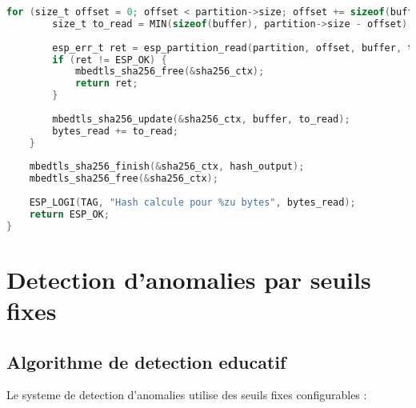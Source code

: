 \begin{lstlisting}[language=C, caption={Module de verification d'integrite - integrity\_checker.c}, label=lst:integrity-checker]
    for (size_t offset = 0; offset < partition->size; offset += sizeof(buffer)) {
        size_t to_read = MIN(sizeof(buffer), partition->size - offset);
        
        esp_err_t ret = esp_partition_read(partition, offset, buffer, to_read);
        if (ret != ESP_OK) {
            mbedtls_sha256_free(&sha256_ctx);
            return ret;
        }
        
        mbedtls_sha256_update(&sha256_ctx, buffer, to_read);
        bytes_read += to_read;
    }
    
    mbedtls_sha256_finish(&sha256_ctx, hash_output);
    mbedtls_sha256_free(&sha256_ctx);
    
    ESP_LOGI(TAG, "Hash calcule pour %zu bytes", bytes_read);
    return ESP_OK;
}
\end{lstlisting}

\section{Detection d'anomalies par seuils fixes}

\subsection{Algorithme de detection educatif}

Le systeme de detection d'anomalies utilise des seuils fixes configurables :

